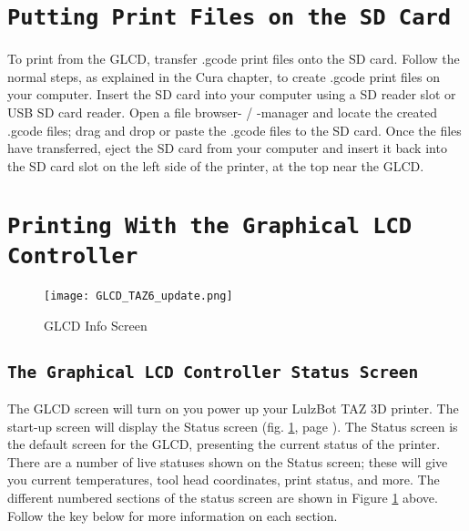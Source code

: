 \section{\texttt{Putting Print Files on the SD Card}}
To print from the GLCD, transfer .gcode print files onto the SD card. Follow the normal steps, as explained in the Cura chapter, to create .gcode print files on your computer. Insert the SD card into your computer using a SD reader slot or USB SD card reader. Open a file browser- / -manager and locate the created .gcode files; drag and drop or paste the .gcode files to the SD card. Once the files have transferred, eject the SD card from your computer and insert it back into the SD card slot on the left side of the printer, at the top near the GLCD.

\section{\texttt{Printing With the Graphical LCD Controller}}
\begin{figure}[b]
\centering
\texttt{[image: GLCD\_TAZ6\_update.png]}
\caption{GLCD Info Screen}
\label{fig:info_screen}
\end{figure}

\subsection{\texttt{The Graphical LCD Controller Status Screen}}
The GLCD screen will turn on you power up your LulzBot TAZ 3D printer. The start-up screen will display the Status screen (fig. \ref{fig:info_screen}, page \pageref{fig:info_screen}). The Status screen is the default screen for the GLCD, presenting the current status of the printer. There are a number of live statuses shown on the Status screen; these will give you current temperatures, tool head coordinates, print status, and more. The different numbered sections of the status screen are shown in Figure \ref{fig:info_screen} above. Follow the key below for more information on each section.

